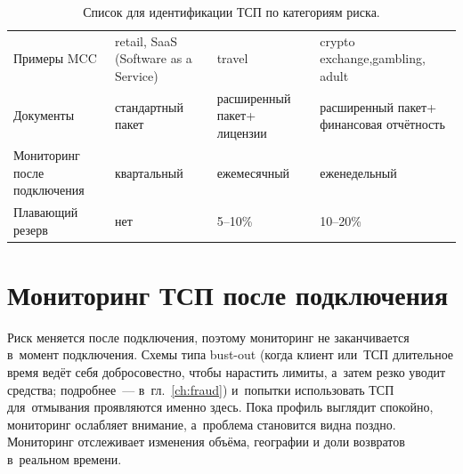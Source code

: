 \begin{table}[H]
  \begingroup
  \scriptsize
  \setlength{\tabcolsep}{4pt}
  \renewcommand{\arraystretch}{1.2}
  \begin{minipage}{\textwidth}
    \begin{tabularx}{\textwidth}{
        @{}B{0.18\textwidth}
        Y
        Y
        Y@{}
      }
      \toprule
      \headrow
       &
       &
       &
       \\
      \midrule
      Примеры MCC &
      retail, SaaS (Software as a Service) &
      travel &
      crypto exchange,\newline gambling, adult \\
      Документы &
      стандартный пакет &
      расширенный пакет\newline + лицензии &
      расширенный пакет\newline + финансовая отчётность \\
      Мониторинг после подключения &
      квартальный &
      ежемесячный &
      еженедельный \\
      Плавающий резерв &
      нет &
      5--10\% &
      10--20\% \\
      \bottomrule
    \end{tabularx}
    \par\smallskip
  \end{minipage}%
  \endgroup
  \caption{Список для идентификации ТСП по категориям риска.}\label{fig:kyb-risk}
\end{table}

\section{Мониторинг ТСП после подключения}\label{sec:merchant-monitoring}

Риск меняется после подключения, поэтому мониторинг не заканчивается
в~момент подключения. Схемы типа bust-out (когда клиент или~ТСП длительное время ведёт
себя добросовестно, чтобы нарастить лимиты, а~затем резко уводит
средства; подробнее~--- в~гл.~\ref{ch:fraud}) и~попытки использовать
ТСП для~отмывания
проявляются именно здесь. Пока профиль выглядит спокойно, мониторинг
ослабляет внимание, а~проблема становится видна поздно. Мониторинг
отслеживает изменения объёма, географии и доли возвратов в~реальном
времени.

